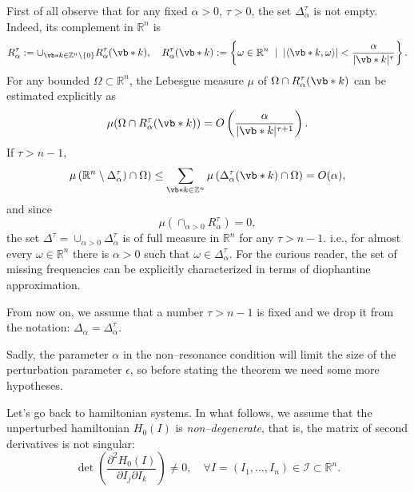 \documentclass[english,fontsize=11pt,paper=b5]{scrbook}
\theoremstyle{definition}
\begin{document}
      First of all observe that for any fixed $\alpha>0$, $\tau>0$, the set $\Delta_\alpha^\tau$ is not empty. Indeed, its complement in $\mathbb{R}^n$ is
      \begin{equation}
        R_{\alpha}^\tau := \cup_{\vb* k \in \mathbb{Z}^n\setminus\{0\}} R_{\alpha}^\tau(\vb* k),\quad
        R_{\alpha}^\tau(\vb* k) := \left\{ \omega \in\mathbb{R}^n \;\mid\; |\langle\vb* k, \omega\rangle| < \frac{\alpha}{|\vb* k|^\tau} \right\}.
      \end{equation}
      For any bounded $\Omega\subset\mathbb{R}^n$, the Lebesgue measure $\mu$ of $\Omega\cap R_{\alpha}^\tau(\vb* k)$ can be estimated explicitly as
      \begin{equation}
        \mu(\Omega\cap R_{\alpha}^\tau(\vb* k)) = O\left(\frac{\alpha}{|\vb* k|^{\tau+1}}\right).
      \end{equation}
      If $\tau > n-1$,
      \begin{equation}
        \mu\left(\mathbb{R}^n\setminus\Delta_\alpha^\tau)\cap\Omega\right)\leq
        \sum_{\vb* k\in\mathbb{Z}^n} \mu\left(\Delta_{\alpha}^\tau(\vb* k)\cap\Omega\right) = O(\alpha),
      \end{equation}
      and since
      \begin{equation}
        \mu\left(\cap_{\alpha>0}R_{\alpha}^\tau\right)=0,
      \end{equation}
      the set $\Delta^\tau = \cup_{\alpha>0}\Delta_\alpha^\tau$ is of full measure in $\mathbb{R}^n$ for any $\tau > n-1$. i.e., for almost every $\omega\in\mathbb{R}^n$ there is $\alpha>0$ such that $\omega \in \Delta^\tau_\alpha$.
      For the curious reader, the set of missing frequencies can be explicitly characterized in terms of diophantine approximation.

      From now on, we assume that a number $\tau > n-1$ is fixed and we drop it from the notation: $\Delta_\alpha = \Delta_\alpha^\tau$.

      Sadly, the parameter $\alpha$ in the non--resonance condition will limit the size of the perturbation parameter $\epsilon$, so before stating the theorem we need some more hypotheses.

      Let's go back to hamiltonian systems.
      In what follows, we assume that the unperturbed hamiltonian $H_0(I)$ is \emph{non--degenerate}, that is, the matrix of second derivatives is not singular:
      \begin{equation}\label{eq:Hnondeg}
        \det\left(\frac{\partial^2 H_0(I)}{\partial I_j \partial I_k}\right) \neq 0, \quad \forall I = (I_1, \ldots, I_n)\in\mathcal{I}\subset\mathbb{R}^n.
      \end{equation}
\end{document}
